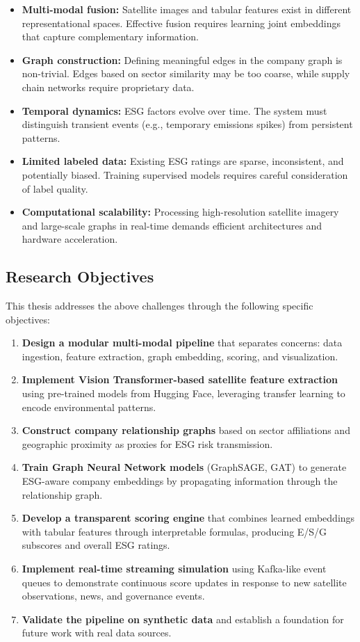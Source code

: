\begin{itemize}
\item \textbf{Multi-modal fusion:} Satellite images and tabular features exist in different representational spaces. Effective fusion requires learning joint embeddings that capture complementary information.
\item \textbf{Graph construction:} Defining meaningful edges in the company graph is non-trivial. Edges based on sector similarity may be too coarse, while supply chain networks require proprietary data.
\item \textbf{Temporal dynamics:} ESG factors evolve over time. The system must distinguish transient events (e.g., temporary emissions spikes) from persistent patterns.
\item \textbf{Limited labeled data:} Existing ESG ratings are sparse, inconsistent, and potentially biased. Training supervised models requires careful consideration of label quality.
\item \textbf{Computational scalability:} Processing high-resolution satellite imagery and large-scale graphs in real-time demands efficient architectures and hardware acceleration.
\end{itemize}

\subsection{Research Objectives}

This thesis addresses the above challenges through the following specific objectives:

\begin{enumerate}
\item \textbf{Design a modular multi-modal pipeline} that separates concerns: data ingestion, feature extraction, graph embedding, scoring, and visualization.
\item \textbf{Implement Vision Transformer-based satellite feature extraction} using pre-trained models from Hugging Face, leveraging transfer learning to encode environmental patterns.
\item \textbf{Construct company relationship graphs} based on sector affiliations and geographic proximity as proxies for ESG risk transmission.
\item \textbf{Train Graph Neural Network models} (GraphSAGE, GAT) to generate ESG-aware company embeddings by propagating information through the relationship graph.
\item \textbf{Develop a transparent scoring engine} that combines learned embeddings with tabular features through interpretable formulas, producing E/S/G subscores and overall ESG ratings.
\item \textbf{Implement real-time streaming simulation} using Kafka-like event queues to demonstrate continuous score updates in response to new satellite observations, news, and governance events.
\item \textbf{Validate the pipeline on synthetic data} and establish a foundation for future work with real data sources.
\end{enumerate}

